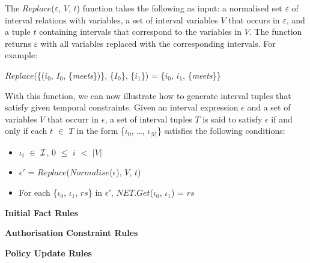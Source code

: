 \documentclass[11pt]{report}
\newenvironment{vquote}
{
  \begin{list}{}{\leftmargin 1em}\item[]
}
{
  \end{list}
}
\begin{document}
\begin{itemize}
              The $Replace$($\varepsilon$, $V$, $t$) function takes the
              following as input: a normalised set $\varepsilon$ of interval
              relations with variables, a set of interval variables $V$ that
              occurs in $\varepsilon$, and a tuple $t$ containing intervals
              that correspond to the variables in $V$. The function returns
              $\varepsilon$ with all variables replaced with the corresponding
              intervals. For example:
            
              \begin{vquote}
                $Replace$(\{($i_0$, $I_0$, \{{\em meets}\})\}, \{$I_0$\}, \{$i_1$\})
                  = \{$i_0$, $i_1$, \{{\em meets}\}\} 
              \end{vquote}
            
              With this function, we can now illustrate how to generate
              interval tuples that satisfy given temporal constraints. Given an
              interval expression $\epsilon$ and a set of variables $V$ that
              occurr in $\epsilon$, a set of interval tuples $T$ is said to
              satisfy $\epsilon$ if and only if each $t$ $\in$ $T$ in the form
              \{${\iota}_0$, \ldots, ${\iota}_{|V|}$\} satisfies the following
              conditions:
            
             \begin{itemize}
               \item
                 ${\iota}_i$ $\in$ ${\cal I}$, $0$ $\leq$ $i$ $<$ $|V|$
             
               \item
                 $\epsilon'$ = 
                 $Replace$($Normalise$($\epsilon$), $V$, $t$)
             
               \item
                 For each \{${\iota}_0$, ${\iota}_1$, $rs$\} in $\epsilon'$,
                 $NET.Get$(${\iota}_0$, ${\iota}_1$) = $rs$
             \end{itemize}

            \item
              {\bf Initial Fact Rules}

            \item
              {\bf Authorisation Constraint Rules}
            
            \item
              {\bf Policy Update Rules}
            

\end{itemize}
\end{document}
